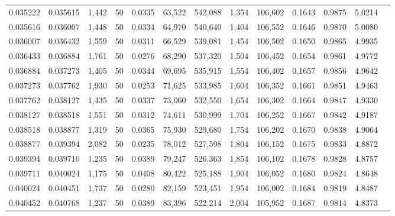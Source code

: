 \begin{tabular}{rrrrrrrrrrrrr}
0.035222 & 0.035615 & 1,442 &  50 &                                     0.0335 &  63,522 & 542,088 &   1,354 & 106,602 & 0.1643 & 0.9875 & 5.0214 \\
0.035616 & 0.036007 & 1,448 &  50 &                                     0.0334 &  64,970 & 540,640 &   1,404 & 106,552 & 0.1646 & 0.9870 & 5.0080 \\
0.036007 & 0.036432 & 1,559 &  50 &                                     0.0311 &  66,529 & 539,081 &   1,454 & 106,502 & 0.1650 & 0.9865 & 4.9935 \\
0.036433 & 0.036884 & 1,761 &  50 &                                     0.0276 &  68,290 & 537,320 &   1,504 & 106,452 & 0.1654 & 0.9861 & 4.9772 \\
0.036884 & 0.037273 & 1,405 &  50 &                                     0.0344 &  69,695 & 535,915 &   1,554 & 106,402 & 0.1657 & 0.9856 & 4.9642 \\
0.037273 & 0.037762 & 1,930 &  50 &                                     0.0253 &  71,625 & 533,985 &   1,604 & 106,352 & 0.1661 & 0.9851 & 4.9463 \\
0.037762 & 0.038127 & 1,435 &  50 &                                     0.0337 &  73,060 & 532,550 &   1,654 & 106,302 & 0.1664 & 0.9847 & 4.9330 \\
0.038127 & 0.038518 & 1,551 &  50 &                                     0.0312 &  74,611 & 530,999 &   1,704 & 106,252 & 0.1667 & 0.9842 & 4.9187 \\
0.038518 & 0.038877 & 1,319 &  50 &                                     0.0365 &  75,930 & 529,680 &   1,754 & 106,202 & 0.1670 & 0.9838 & 4.9064 \\
0.038877 & 0.039394 & 2,082 &  50 &                                     0.0235 &  78,012 & 527,598 &   1,804 & 106,152 & 0.1675 & 0.9833 & 4.8872 \\
0.039394 & 0.039710 & 1,235 &  50 &                                     0.0389 &  79,247 & 526,363 &   1,854 & 106,102 & 0.1678 & 0.9828 & 4.8757 \\
0.039711 & 0.040024 & 1,175 &  50 &                                     0.0408 &  80,422 & 525,188 &   1,904 & 106,052 & 0.1680 & 0.9824 & 4.8648 \\
0.040024 & 0.040451 & 1,737 &  50 &                                     0.0280 &  82,159 & 523,451 &   1,954 & 106,002 & 0.1684 & 0.9819 & 4.8487 \\
0.040452 & 0.040768 & 1,237 &  50 &                                     0.0389 &  83,396 & 522,214 &   2,004 & 105,952 & 0.1687 & 0.9814 & 4.8373 \\

\end{tabular}
